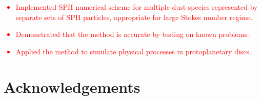 \documentclass[fleqn,usenatbib]{mnras}
\begin{document}
\textcolor{red}{
\begin{itemize}
   \item Implemented SPH numerical scheme for multiple dust species represented
      by separate sets of SPH particles, appropriate for large Stokes number
      regime.
   \item Demonstrated that the method is accurate by testing on known problems.
   \item Applied the method to simulate physical processes in protoplanetary
      discs.
\end{itemize}
}

\section*{Acknowledgements}
















\bsp %
\label{lastpage}
\end{document}
